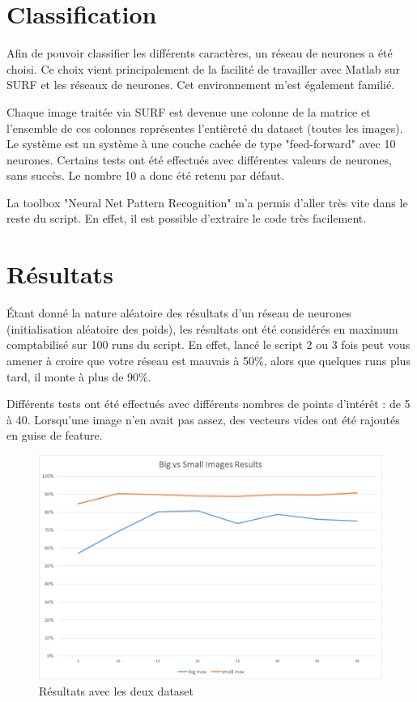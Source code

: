 \section{Classification}

Afin de pouvoir classifier les différents caractères, un réseau de neurones a été choisi. Ce choix vient principalement de la facilité de travailler avec Matlab sur SURF et les réseaux de neurones. Cet environnement m'est également familié.

Chaque image traitée via SURF est devenue une colonne de la matrice et l'ensemble de ces colonnes représentes l'entièreté du dataset (toutes les images). Le système est un système à une couche cachée de type "feed-forward" avec 10 neurones. Certains tests ont été effectués avec différentes valeurs de neurones, sans succès. Le nombre 10 a donc été retenu par défaut.

La toolbox "Neural Net Pattern Recognition" m'a permis d'aller très vite dans le reste du script. En effet, il est possible d'extraire le code très facilement.

\section{Résultats}

Étant donné la nature aléatoire des résultats d'un réseau de neurones (initialisation aléatoire des poids), les résultats ont été considérés en maximum comptabilisé sur 100 runs du script. En effet, lancé le script 2 ou 3 fois peut vous amener à croire que votre réseau est mauvais à 50\%, alors que quelques runs plus tard, il monte à plus de 90\%.

Différents tests ont été effectués avec différents nombres de points d'intérêt : de 5 à 40. Lorsqu'une image n'en avait pas assez, des vecteurs vides ont été rajoutés en guise de feature. 

\begin{figure}[h]
\centering
\includegraphics[width=0.8\linewidth]{pictures/bigvssmallresults.png}
\caption{Résultats avec les deux dataset}
\label{fig:resultdataset}
\end{figure}


